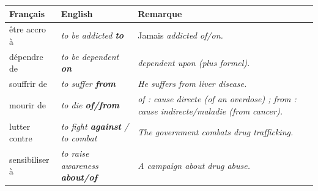 \documentclass[11pt]{article}
\newcommand{\eng}[1]{\ifmmode\text{\textit{#1}}\else\begingroup\selectlanguage{english}\itshape #1\endgroup\fi}
\begin{document}
\begin{propriete}
\begin{center}
\begin{tabularx}{\linewidth}{|X|X|X|}
\hline
\rowcolor{popblueL} \textbf{Français} & \textbf{English} & \textbf{Remarque} \\
\hline
être accro à & \eng{to be addicted \textbf{to}} & Jamais \eng{addicted of/on}. \\
dépendre de & \eng{to be dependent \textbf{on}} & \eng{dependent upon} (plus formel). \\
souffrir de & \eng{to suffer \textbf{from}} & \eng{He suffers from liver disease.} \\
mourir de & \eng{to die \textbf{of/from}} & \eng{of} : cause directe (\eng{of an overdose}) ; \eng{from} : cause indirecte/maladie (\eng{from cancer}). \\
lutter contre & \eng{to fight \textbf{against}} / \eng{to combat} & \eng{The government combats drug trafficking.} \\
sensibiliser à & \eng{to raise awareness \textbf{about/of}} & \eng{A campaign about drug abuse.} \\
\hline
\end{tabularx}
\end{center}
\end{propriete}
\end{document}
